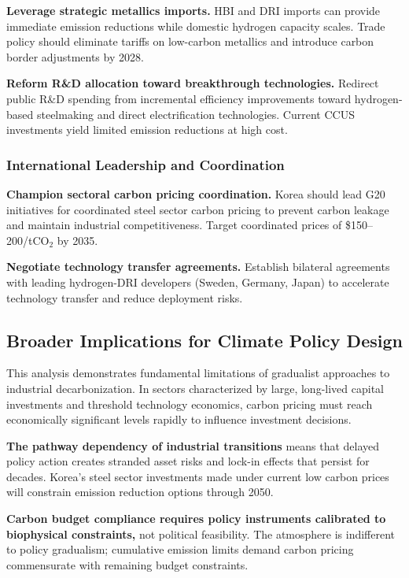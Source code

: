 \documentclass[preprint,5p,authoryear]{elsarticle}
\begin{document}
\textbf{Leverage strategic metallics imports.} HBI and DRI imports can provide immediate emission reductions while domestic hydrogen capacity scales. Trade policy should eliminate tariffs on low-carbon metallics and introduce carbon border adjustments by 2028.

\textbf{Reform R\&D allocation toward breakthrough technologies.} Redirect public R\&D spending from incremental efficiency improvements toward hydrogen-based steelmaking and direct electrification technologies. Current CCUS investments yield limited emission reductions at high cost.

\subsubsection{International Leadership and Coordination}

\textbf{Champion sectoral carbon pricing coordination.} Korea should lead G20 initiatives for coordinated steel sector carbon pricing to prevent carbon leakage and maintain industrial competitiveness. Target coordinated prices of \$150--200/tCO$_2$ by 2035.

\textbf{Negotiate technology transfer agreements.} Establish bilateral agreements with leading hydrogen-DRI developers (Sweden, Germany, Japan) to accelerate technology transfer and reduce deployment risks.

\subsection{Broader Implications for Climate Policy Design}

This analysis demonstrates fundamental limitations of gradualist approaches to industrial decarbonization. In sectors characterized by large, long-lived capital investments and threshold technology economics, carbon pricing must reach economically significant levels rapidly to influence investment decisions.

\textbf{The pathway dependency of industrial transitions} means that delayed policy action creates stranded asset risks and lock-in effects that persist for decades. Korea's steel sector investments made under current low carbon prices will constrain emission reduction options through 2050.

\textbf{Carbon budget compliance requires policy instruments calibrated to biophysical constraints,} not political feasibility. The atmosphere is indifferent to policy gradualism; cumulative emission limits demand carbon pricing commensurate with remaining budget constraints.
\end{document}
